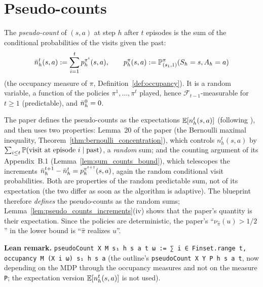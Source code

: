 \section{Pseudo-counts}
\label{sec:empirical_pseudo}

\begin{definition}\label{def:pseudo_counts}
\leanok
{}
The \emph{pseudo-count} of $(s, a)$ at step $h$ after $t$ episodes is the sum of the conditional
probabilities of the visits given the past:
\[
  \bar{n}_h^t(s, a) := \sum_{i = 1}^{t} p^{\pi^i}_h(s, a),
  \qquad
  p^\pi_h(s, a) := \mathbb{P}^\pi_{(s_1, 1)}(S_h = s, A_h = a)
\]
(the occupancy measure of $\pi$, Definition~\ref{def:occupancy}). It is a random variable, a
function of the policies $\pi^1, \dots, \pi^t$ played, hence $\mathcal F_{t-1}$-measurable for
$t \ge 1$ (predictable), and $\bar{n}_h^0 = 0$.
\end{definition}

\begin{remark}\label{rem:empirical_pseudo_counts}
The paper defines the pseudo-counts as the expectations $\mathbb{E}[n_h^t(s, a)]$ (following
\cite{menard2021fast}), and then uses two properties: Lemma~20 of the paper (the Bernoulli
maximal inequality, Theorem~\ref{thm:bernoulli_concentration}), which controls
$n_h^t(s, a)$ by $\sum_{i \le t} \mathbb{P}(\text{visit at episode } i \mid \text{past})$, a
\emph{random} sum; and the counting argument of its Appendix~B.1 (Lemma~\ref{lem:sum_counts_bound}),
which telescopes the increments $\bar{n}_h^{t+1} - \bar{n}_h^t = p^{\pi^{t+1}}_h(s, a)$, again the random
conditional visit probabilities. Both are properties of the random predictable sum, not of its
expectation (the two differ as soon as the algorithm is adaptive). The blueprint therefore
\emph{defines} the pseudo-counts as the random sums; Lemma~\ref{lem:pseudo_counts_increments}(iv)
shows that the paper's quantity is their expectation. Since the policies are deterministic,
the paper's ``$\nu_{\hat\pi}(u) > 1/2$'' in the lower bound is ``$\hat\pi$ realizes $u$''.
\end{remark}

\textbf{Lean remark.} \texttt{pseudoCount X M s₁ h s a t ω := ∑ i ∈ Finset.range t, occupancy M (X i ω) s₁ h s a}
(the outline's \texttt{pseudoCount X Y P h s a t}, now depending on the MDP through the
occupancy measures and not on the measure \texttt{P}; the expectation version
$\mathbb{E}[n_h^t(s, a)]$ is not used).

